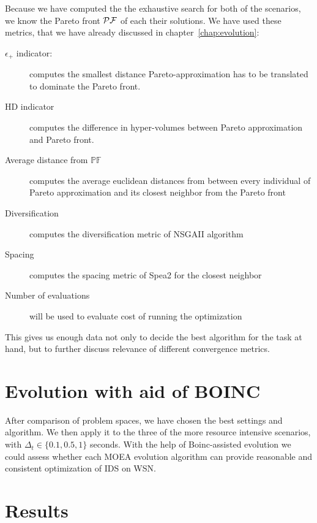 \documentclass[12pt,oneside]{fithesis2}
\begin{document}
Because we have computed the the exhaustive search for both of the scenarios, we know the Pareto front $\cal{PF}$ of each their solutions. We have used these metrics, that we have already discussed in chapter~\ref{chap:evolution}:

\begin{description}
  \item[$\epsilon_+$ indicator:] computes the smallest distance Pareto-approximation has to be translated to dominate the Pareto front.
  \item[HD indicator] computes the difference in hyper-volumes between Pareto approximation and Pareto front.
  \item[Average distance from $\mathbb{PF}$] computes the average euclidean distances from between every individual of Pareto approximation and its closest neighbor from the Pareto front
  \item[Diversification] computes the diversification metric of NSGAII algorithm
  \item[Spacing] computes the spacing metric of Spea2 for the closest neighbor
  \item[Number of evaluations] will be used to evaluate cost of running the optimization
\end{description}
 
This gives us enough data not only to decide the best algorithm for the task at hand, but to further discuss relevance of different convergence metrics.

\section{Evolution with aid of BOINC}

After comparison of problem spaces, we have chosen the best settings and algorithm. We then apply it to the three of the more resource intensive scenarios, with $\Delta_t \in \{0.1,0.5,1\}$ seconds. With the help of Boinc-assisted evolution we could assess whether each MOEA evolution algorithm can provide reasonable and consistent optimization of IDS on WSN.

\section{Results}





\end{document}

